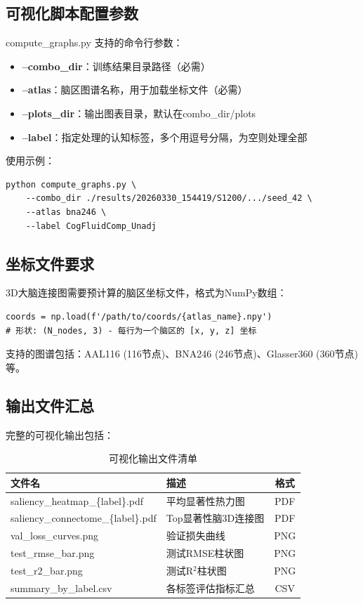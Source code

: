 \documentclass[UTF8, a4paper, 12pt]{article}
\begin{document}
\subsection{可视化脚本配置参数}

compute\_graphs.py 支持的命令行参数：

\begin{itemize}
    \item \textbf{--combo\_dir}：训练结果目录路径（必需）
    \item \textbf{--atlas}：脑区图谱名称，用于加载坐标文件（必需）
    \item \textbf{--plots\_dir}：输出图表目录，默认在combo\_dir/plots
    \item \textbf{--label}：指定处理的认知标签，多个用逗号分隔，为空则处理全部
\end{itemize}

使用示例：

\begin{verbatim}
python compute_graphs.py \
    --combo_dir ./results/20260330_154419/S1200/.../seed_42 \
    --atlas bna246 \
    --label CogFluidComp_Unadj
\end{verbatim}

\subsection{坐标文件要求}

3D大脑连接图需要预计算的脑区坐标文件，格式为NumPy数组：

\begin{verbatim}
coords = np.load(f'/path/to/coords/{atlas_name}.npy')
# 形状: (N_nodes, 3) - 每行为一个脑区的 [x, y, z] 坐标
\end{verbatim}

支持的图谱包括：AAL116 (116节点)、BNA246 (246节点)、Glasser360 (360节点)等。

\subsection{输出文件汇总}

完整的可视化输出包括：

\begin{table}[htbp]
\centering
\caption{可视化输出文件清单}
\label{tab:output_files}
\begin{tabular}{llc}
\toprule
文件名 & 描述 & 格式 \\
\midrule
saliency\_heatmap\_\{label\}.pdf & 平均显著性热力图 & PDF \\
saliency\_connectome\_\{label\}.pdf & Top显著性脑3D连接图 & PDF \\
val\_loss\_curves.png & 验证损失曲线 & PNG \\
test\_rmse\_bar.png & 测试RMSE柱状图 & PNG \\
test\_r2\_bar.png & 测试R$^2$柱状图 & PNG \\
summary\_by\_label.csv & 各标签评估指标汇总 & CSV \\
\bottomrule
\end{tabular}
\end{table}
\end{document}
